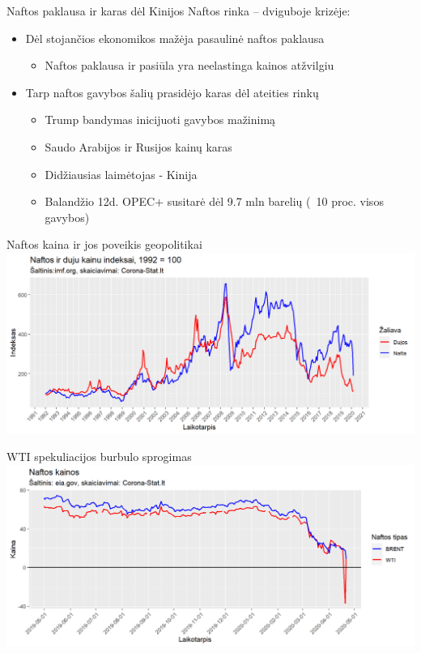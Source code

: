\documentclass[11pt]{beamer}
\begin{document}
\begin{frame}{Naftos paklausa ir karas dėl Kinijos}
Naftos rinka – dviguboje krizėje:
\begin{itemize}
\item Dėl stojančios ekonomikos mažėja pasaulinė naftos paklausa
\begin{itemize}
\item Naftos paklausa ir pasiūla yra neelastinga kainos atžvilgiu
\end{itemize}
\item Tarp naftos gavybos šalių prasidėjo karas dėl ateities rinkų
\begin{itemize}
\item Trump bandymas inicijuoti gavybos mažinimą
\item Saudo Arabijos ir Rusijos kainų karas
\item Didžiausias laimėtojas - Kinija
\item Balandžio 12d. OPEC+ susitarė dėl 9.7 mln barelių (~10 proc. visos gavybos)
\end{itemize}
\end{itemize}
\end{frame}


\begin{frame}{Naftos kaina ir jos poveikis geopolitikai}
\includegraphics[scale=0.5]{naftos_kainos_monthly.png}
\end{frame}

\begin{frame}{WTI spekuliacijos burbulo sprogimas}
\includegraphics[scale=0.5]{naftos_kainos_daily.png}
\end{frame}
\end{document}
